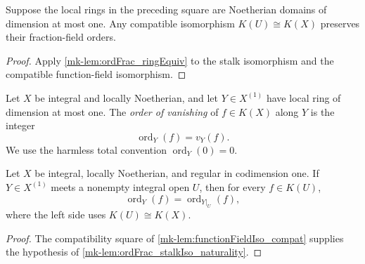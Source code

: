 \begin{lemma}
  \label{mk-lem:ordFrac_stalkIso_naturality}
  \leanok


  Suppose the local rings in the preceding square are Noetherian domains of
  dimension at most one.  Any compatible isomorphism \(K(U)\cong K(X)\)
  preserves their fraction-field orders.
\end{lemma}
\begin{proof}
  \leanok
  Apply \ref{mk-lem:ordFrac_ringEquiv} to the stalk isomorphism and the
  compatible function-field isomorphism.
\end{proof}

\begin{definition}
  \label{mk-def:order_at_point}
  \leanok


  Let \(X\) be integral and locally Noetherian, and let \(Y\in X^{(1)}\)
  have local ring of dimension at most one.  The \emph{order of vanishing}
  of \(f\in K(X)\) along \(Y\) is the integer
  \[
    \operatorname{ord}_Y(f)=v_Y(f).
  \]
  We use the harmless total convention \(\operatorname{ord}_Y(0)=0\).
\end{definition}

\begin{lemma}
  \label{mk-lem:order_eq_order_restrict}
  \leanok


  Let \(X\) be integral, locally Noetherian, and regular in codimension one.
  If \(Y\in X^{(1)}\) meets a nonempty integral open \(U\), then for every
  \(f\in K(U)\),
  \[
    \operatorname{ord}_Y(f)
      =\operatorname{ord}_{Y|_U}(f),
  \]
  where the left side uses \(K(U)\cong K(X)\).
\end{lemma}
\begin{proof}
  \leanok
  The compatibility square of \ref{mk-lem:functionFieldIso_compat} supplies
  the hypothesis of \ref{mk-lem:ordFrac_stalkIso_naturality}.
\end{proof}

